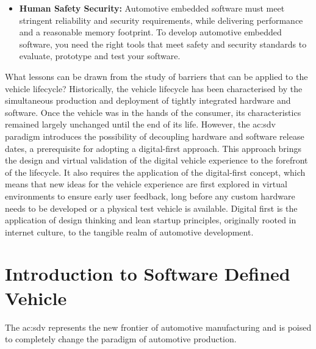 \begin{itemize}
    \item \textbf{Human Safety Security:} Automotive embedded software must meet stringent reliability and security requirements, while delivering performance and a reasonable memory footprint. To develop automotive embedded software, you need the right tools that meet safety and security standards to evaluate, prototype and test your software.
\end{itemize}

What lessons can be drawn from the study of barriers that can be applied to the vehicle lifecycle? Historically, the vehicle lifecycle has been characterised by the simultaneous production and deployment of tightly integrated hardware and software. Once the vehicle was in the hands of the consumer, its characteristics remained largely unchanged until the end of its life. However, the \gls{ac:sdv} paradigm introduces the possibility of decoupling hardware and software release dates, a prerequisite for adopting a digital-first approach. This approach brings the design and virtual validation of the digital vehicle experience to the forefront of the lifecycle.
It also requires the application of the digital-first concept, which means that new ideas for the vehicle experience are first explored in virtual environments to ensure early user feedback, long before any custom hardware needs to be developed or a physical test vehicle is available. Digital first is the application of design thinking and lean startup principles, originally rooted in internet culture, to the tangible realm of automotive development.


\section{Introduction to Software Defined Vehicle}
The \gls{ac:sdv} represents the new frontier of automotive manufacturing and is poised to completely change the paradigm of automotive production. 


